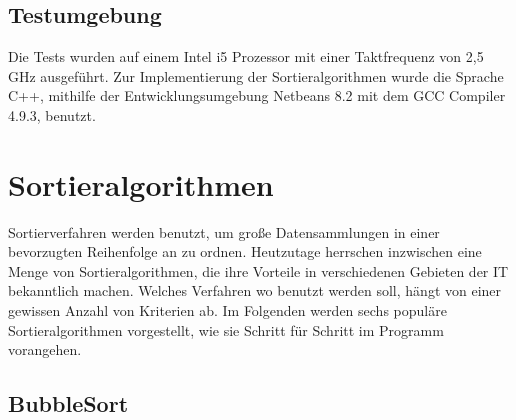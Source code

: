 \documentclass{article}
\begin{document}
\subsection{Testumgebung}
Die Tests wurden auf einem Intel i5 Prozessor mit einer Taktfrequenz von 2,5 GHz ausgeführt. Zur Implementierung der Sortieralgorithmen wurde die Sprache C++, mithilfe der Entwicklungsumgebung Netbeans 8.2 mit dem GCC Compiler 4.9.3, benutzt.

\section{Sortieralgorithmen}
Sortierverfahren werden benutzt, um große Datensammlungen in einer bevorzugten Reihenfolge an zu ordnen. Heutzutage herrschen inzwischen eine Menge von Sortieralgorithmen, die ihre Vorteile in verschiedenen Gebieten der IT bekanntlich machen. Welches Verfahren wo benutzt werden soll, hängt von einer gewissen Anzahl von Kriterien ab.
Im Folgenden werden sechs populäre Sortieralgorithmen vorgestellt, wie sie Schritt für Schritt im Programm vorangehen.

\subsection{BubbleSort}

\end{document}
